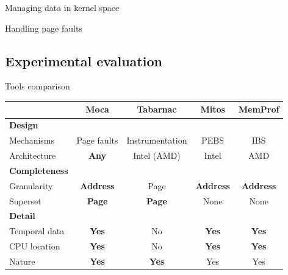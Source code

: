 \documentclass[xcolor={usenames,dvipsnames},hyperref={pdfusetitle}]{beamer}
\begin{document}
\begin{frame}{Managing data in kernel space}
    \centering
    \resizebox{!}{.85\textheight}{
        
    }
\end{frame}

\begin{frame}{Handling page faults}
    \centering
    \resizebox{!}{.8\textheight}{
        
    }
\end{frame}

\subsection{Experimental evaluation}

\begin{frame}{Tools comparison}
    \small
    \begin{tabular}{lcccc}
        \toprule
         & \textbf{Moca} & \textbf{Tabarnac} & \textbf{Mitos} & \textbf{MemProf} \\
            \midrule
            \textbf{Design} & & & &\\
            \midrule
            Mechanisms   & Page faults  & Instrumentation & PEBS & IBS \\
            Architecture & \textbf{Any} & Intel (AMD) & Intel & AMD   \\
            \midrule
            \textbf{Completeness} & & & &\\
            \midrule
            Granularity & \textbf{Address} & Page          & \textbf{Address} & \textbf{Address} \\
            Superset          & \textbf{Page} & \textbf{Page} & None             & None             \\
            \midrule
            \textbf{Detail} & & & &\\
            \midrule
            Temporal data & \textbf{Yes} & No          & \textbf{Yes} & \textbf{Yes} \\
            CPU location  & \textbf{Yes} & No          & \textbf{Yes} & \textbf{Yes} \\
            Nature        & \textbf{Yes} &\textbf{Yes} & Yes         & Yes       \\
        \bottomrule
    \end{tabular}
\end{frame}
\end{document}
